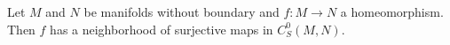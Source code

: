 Let $M$ and $N$ be manifolds without boundary and $f: M \to N$ a homeomorphism. Then $f$ has a neighborhood of surjective maps in $C^0_S(M,N)$.
